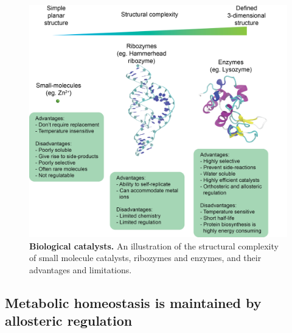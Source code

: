 %
%
%
\begin{figure}[!ht]
\includegraphics[scale=0.6]{catalysts.png}
\caption[Biological catalysts.]{\textbf{Biological catalysts.} An illustration of the structural complexity of small molecule catalysts, ribozymes and enzymes, and their advantages and limitations.}
\label{fig:biol_catalysts}
\end{figure}
%
%
\clearpage

\subsection{Metabolic homeostasis is maintained by allosteric regulation}

